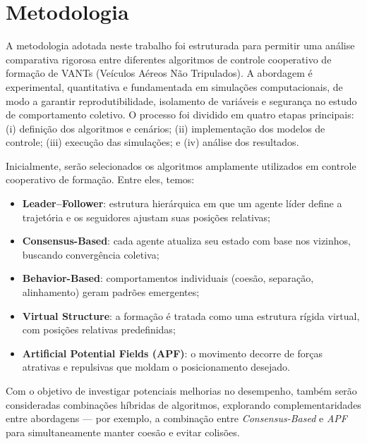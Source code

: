 
\section{Metodologia}
\label{sec:metodologia}

A metodologia adotada neste trabalho foi estruturada para permitir uma análise comparativa rigorosa entre diferentes algoritmos de controle cooperativo de formação de VANTs (Veículos Aéreos Não Tripulados). A abordagem é experimental, quantitativa e fundamentada em simulações computacionais, de modo a garantir reprodutibilidade, isolamento de variáveis e segurança no estudo de comportamento coletivo. O processo foi dividido em quatro etapas principais: (i) definição dos algoritmos e cenários; (ii) implementação dos modelos de controle; (iii) execução das simulações; e (iv) análise dos resultados.

Inicialmente, serão selecionados os algoritmos amplamente utilizados em controle cooperativo de formação. Entre eles, temos:

\begin{itemize}
    \item \textbf{Leader–Follower}: estrutura hierárquica em que um agente líder define a trajetória e os seguidores ajustam suas posições relativas;
    \item \textbf{Consensus-Based}: cada agente atualiza seu estado com base nos vizinhos, buscando convergência coletiva;
    \item \textbf{Behavior-Based}: comportamentos individuais (coesão, separação, alinhamento) geram padrões emergentes;
    \item \textbf{Virtual Structure}: a formação é tratada como uma estrutura rígida virtual, com posições relativas predefinidas;
    \item \textbf{Artificial Potential Fields (APF)}: o movimento decorre de forças atrativas e repulsivas que moldam o posicionamento desejado.
\end{itemize}

Com o objetivo de investigar potenciais melhorias no desempenho, também serão consideradas combinações híbridas de algoritmos, explorando complementaridades entre abordagens — por exemplo, a combinação entre \textit{Consensus-Based} e \textit{APF} para simultaneamente manter coesão e evitar colisões.


